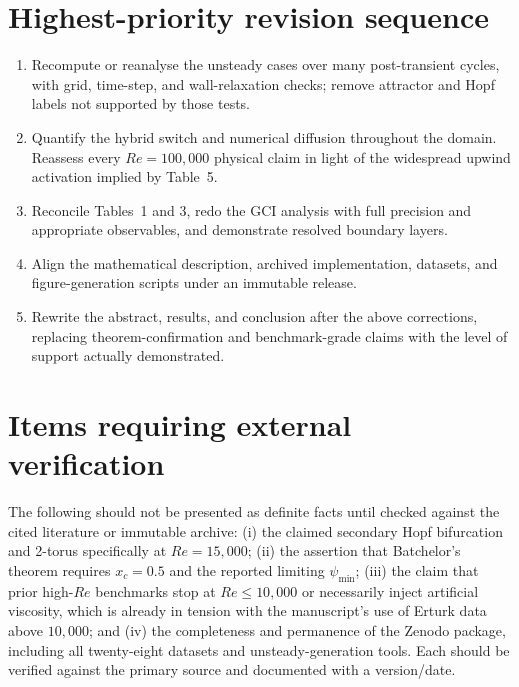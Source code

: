 \documentclass[11pt]{article}
\begin{document}
\section*{Highest-priority revision sequence}

\begin{enumerate}
  \item Recompute or reanalyse the unsteady cases over many post-transient cycles, with grid, time-step, and wall-relaxation checks; remove attractor and Hopf labels not supported by those tests.
  \item Quantify the hybrid switch and numerical diffusion throughout the domain.  Reassess every $Re=100{,}000$ physical claim in light of the widespread upwind activation implied by Table~5.
  \item Reconcile Tables~1 and 3, redo the GCI analysis with full precision and appropriate observables, and demonstrate resolved boundary layers.
  \item Align the mathematical description, archived implementation, datasets, and figure-generation scripts under an immutable release.
  \item Rewrite the abstract, results, and conclusion after the above corrections, replacing theorem-confirmation and benchmark-grade claims with the level of support actually demonstrated.
\end{enumerate}

\section*{Items requiring external verification}

The following should not be presented as definite facts until checked against the cited literature or immutable archive: (i) the claimed secondary Hopf bifurcation and 2-torus specifically at $Re=15{,}000$; (ii) the assertion that Batchelor's theorem requires $x_c=0.5$ and the reported limiting $\psi_{\min}$; (iii) the claim that prior high-$Re$ benchmarks stop at $Re\leq10{,}000$ or necessarily inject artificial viscosity, which is already in tension with the manuscript's use of Erturk data above $10{,}000$; and (iv) the completeness and permanence of the Zenodo package, including all twenty-eight datasets and unsteady-generation tools.  Each should be verified against the primary source and documented with a version/date.
\end{document}
